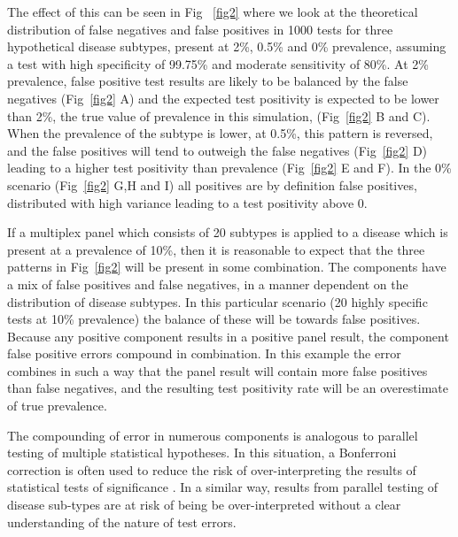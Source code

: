 \documentclass[10pt,letterpaper]{article}
\begin{document}
The effect of this can be seen in Fig ~\ref{fig2} where we look at the theoretical distribution of false negatives and false positives in 1000 tests for three hypothetical disease subtypes, present at 2\%, 0.5\% and 0\% prevalence, assuming a test with high specificity of 99.75\% and moderate sensitivity of 80\%. At 2\% prevalence, false positive test results are likely to be balanced by the false negatives (Fig~\ref{fig2} A) and the expected test positivity is expected to be lower than 2\%, the true value of prevalence in this simulation, (Fig~\ref{fig2} B and C). When the prevalence of the subtype is lower, at 0.5\%, this pattern is reversed, and the false positives will tend to outweigh the false negatives (Fig~\ref{fig2} D) leading to a higher test positivity than prevalence (Fig~\ref{fig2} E and F). In the 0\% scenario (Fig~\ref{fig2} G,H and I) all positives are by definition false positives,  distributed with high variance leading to a test positivity above 0.

If a multiplex panel which consists of 20 subtypes is applied to a disease which is present at a prevalence of 10\%, then it is reasonable to expect that the three patterns in Fig~\ref{fig2} will be present in some combination. The components have a mix of false positives and false negatives, in a manner dependent on the distribution of disease subtypes. In this particular scenario (20 highly specific tests at 10\% prevalence) the balance of these will be towards false positives. Because any positive component results in a positive panel result, the component false positive errors compound in combination. In this example the error combines in such a way that the panel result will contain more false positives than false negatives, and the resulting test positivity rate will be an overestimate of true prevalence.


The compounding of error in numerous components is analogous to parallel testing of multiple statistical hypotheses. In this situation, a Bonferroni correction is often used to reduce the risk of over-interpreting the results of statistical tests of significance \cite{shaffer1995}. In a similar way, results from parallel testing of disease sub-types are at risk of being be over-interpreted without a clear understanding of the nature of test errors.
\end{document}
